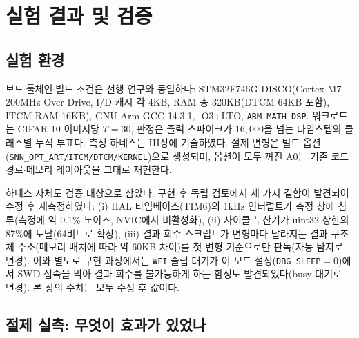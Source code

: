 \section{실험 결과 및 검증}\label{sec:eval}

\subsection{실험 환경}

보드$\cdot$툴체인$\cdot$빌드 조건은 선행 연구\cite{cha2026fusion}와
동일하다: STM32F746G-DISCO(Cortex-M7 200MHz Over-Drive, I/D 캐시
각 4KB, RAM 총 320KB(DTCM 64KB 포함), ITCM-RAM
16KB)\cite{st_rm0385}, GNU Arm
GCC 14.3.1, -O3+LTO, \texttt{ARM\_MATH\_DSP}. 워크로드는 CIFAR-10
\cite{krizhevsky2009cifar} 이미지당 $T{=}30$, 판정은 출력 스파이크가
$16{,}000$을 넘는 타임스텝의 클래스별 누적 투표다. 측정 하네스는
III장에 기술하였다. 절제 변형은 빌드 옵션
(\texttt{SNN\_OPT\_ART/ITCM/DTCM/KERNEL})으로 생성되며, 옵션이 모두
꺼진 A0는 기존 코드 경로$\cdot$메모리 레이아웃을 그대로 재현한다.

하네스 자체도 검증 대상으로 삼았다. 구현 후 독립 검토에서 세 가지
결함이 발견되어 수정 후 재측정하였다: (i) HAL 타임베이스(TIM6)의
1kHz 인터럽트가 측정 창에 침투(측정에 약 0.1\% 노이즈, NVIC에서
비활성화), (ii) 사이클 누산기가 uint32 상한의 87\%에 도달(64비트로
확장), (iii) 결과 회수 스크립트가 변형마다 달라지는 결과 구조체
주소(메모리 배치에 따라 약 60KB 차이)를 첫 변형 기준으로만
판독(자동 탐지로 변경). 이와 별도로 구현 과정에서는 \texttt{WFI}
슬립 대기가 이 보드 설정(\texttt{DBG\_SLEEP}$=$0)에서 SWD 접속을
막아 결과 회수를 불가능하게 하는 함정도 발견되었다(busy 대기로
변경). 본 장의 수치는 모두 수정 후 값이다.

\subsection{절제 실측: 무엇이 효과가 있었나}

